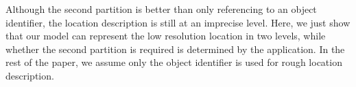 Although the second partition is better than only referencing to an object identifier, the location description is still at an imprecise level. Here, we just show that our model can represent the low resolution location in two levels, 
while whether the second partition is required is determined by the application. In the rest of the paper, we assume only the object identifier is used for rough location description. 
